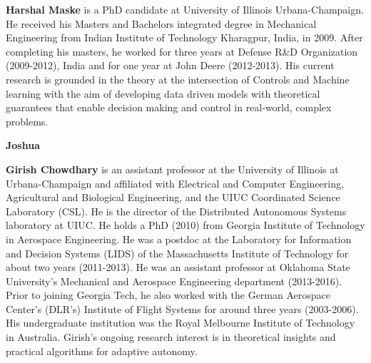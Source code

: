 \documentclass[letterpaper,12pt,peerreviewca,draftcls]{IEEEtran}
\begin{document}
\noindent \textbf{Harshal Maske} is a PhD candidate at University
of Illinois Urbana-Champaign. He received his Masters
and Bachelors integrated degree in Mechanical
Engineering from Indian Institute of Technology
Kharagpur, India, in 2009. After completing his
masters, he worked for three years at Defense R\&D
Organization (2009-2012), India and for one year
at John Deere (2012-2013). His current research is
grounded in the theory at the intersection of Controls
and Machine learning with the aim of developing
data driven models with theoretical guarantees that
enable decision making and control in real-world, complex problems.

\noindent \textbf{Joshua}

\noindent \textbf{Girish Chowdhary} is an assistant professor at the University of Illinois at Urbana-Champaign and affiliated with Electrical and Computer Engineering, Agricultural and Biological Engineering, and the UIUC Coordinated Science Laboratory (CSL). He is the director of the Distributed Autonomous Systems laboratory at UIUC. He holds a PhD (2010) from Georgia Institute of Technology in Aerospace Engineering. He was a postdoc at the Laboratory for Information and Decision Systems (LIDS) of the Massachusetts Institute of Technology for about two years (2011-2013). He was an assistant professor at Oklahoma State University’s Mechanical and Aerospace Engineering department (2013-2016). Prior to joining Georgia Tech, he also worked with the German Aerospace Center's (DLR's) Institute of Flight Systems for around three years (2003-2006). His undergraduate institution was the Royal Melbourne Institute of Technology in Australia. Girish's ongoing research interest is in theoretical insights and practical algorithms for adaptive autonomy. 
\end{document}
